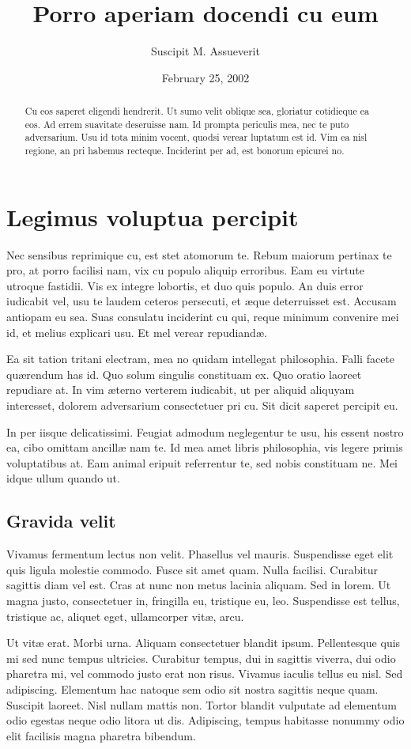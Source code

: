 \documentclass[12pt,letterpaper]{article}
\title{Porro aperiam docendi cu eum}
\author{Suscipit M. Assueverit}
\date{February 25, 2002}
\begin{document}
\maketitle

\begin{abstract}
  Cu eos saperet eligendi hendrerit.  Ut sumo velit oblique sea,
  gloriatur cotidieque ea eos. Ad errem suavitate deseruisse nam. Id
  prompta periculis mea, nec te puto adversarium. Usu id tota minim
  vocent, quodsi verear luptatum est id.  Vim ea nisl regione, an pri
  habemus recteque. Inciderint per ad, est bonorum epicurei no.
\end{abstract}

\section{Legimus voluptua percipit}

Nec sensibus reprimique cu, est stet atomorum te. Rebum maiorum
pertinax te pro, at porro facilisi nam, vix cu populo aliquip
erroribus. Eam eu virtute utroque fastidii.  Vis ex integre lobortis,
et duo quis populo. An duis error iudicabit vel, usu te laudem ceteros
persecuti, et \ae{}que deterruisset est. Accusam antiopam eu sea. Suas
consulatu inciderint cu qui, reque minimum convenire mei id, et melius
explicari usu. Et mel verear repudiand\ae{}.

Ea sit tation tritani electram, mea no quidam intellegat philosophia.
Falli facete qu\ae{}rendum has id. Quo solum singulis constituam
ex. Quo oratio laoreet repudiare at. In vim \ae{}terno verterem
iudicabit, ut per aliquid aliquyam interesset, dolorem adversarium
consectetuer pri cu. Sit dicit saperet percipit eu.

In per iisque delicatissimi. Feugiat admodum neglegentur te usu, his
essent nostro ea, cibo omittam ancill\ae{} nam te. Id mea amet libris
philosophia, vis legere primis voluptatibus at. Eam animal eripuit
referrentur te, sed nobis constituam ne. Mei idque ullum quando ut.

\subsection{Gravida velit}

Vivamus fermentum lectus non velit. Phasellus vel mauris. Suspendisse
eget elit quis ligula molestie commodo. Fusce sit amet quam. Nulla
facilisi. Curabitur sagittis diam vel est. Cras at nunc non metus
lacinia aliquam. Sed in lorem. Ut magna justo, consectetuer in,
fringilla eu, tristique eu, leo. Suspendisse est tellus, tristique ac,
aliquet eget, ullamcorper vit\ae{}, arcu.

Ut vit\ae{} erat. Morbi urna. Aliquam consectetuer blandit
ipsum. Pellentesque quis mi sed nunc tempus ultricies. Curabitur
tempus, dui in sagittis viverra, dui odio pharetra mi, vel commodo
justo erat non risus. Vivamus iaculis tellus eu nisl. Sed adipiscing.
Elementum hac natoque sem odio sit nostra sagittis neque
quam. Suscipit laoreet. Nisl nullam mattis non. Tortor blandit
vulputate ad elementum odio egestas neque odio litora ut
dis. Adipiscing, tempus habitasse nonummy odio elit facilisis magna
pharetra bibendum.
\end{document}
